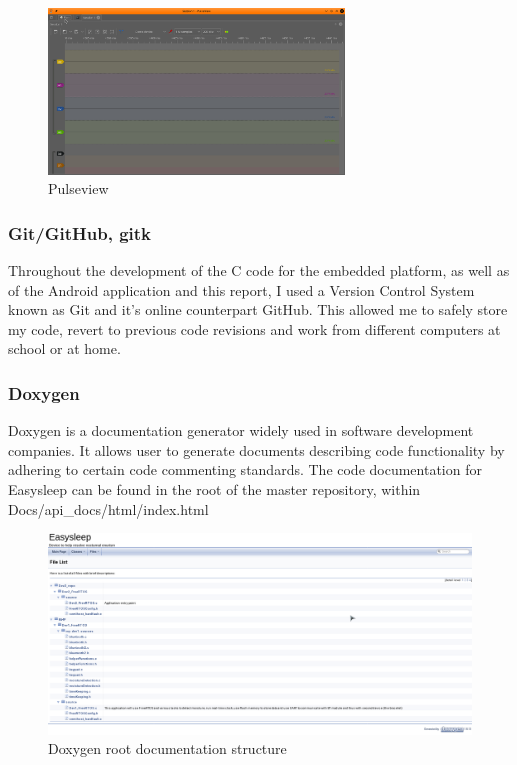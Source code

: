 \documentclass[12pt,a4paper]{article}
\begin{document}
            \begin{figure}[h]
                \centering
                \includegraphics[width=0.7\textwidth]{pulseview}
                \caption{Pulseview}
                \label{fig:pulseView}
            \end{figure}
        
            \subsubsection{Git/GitHub, gitk}
            Throughout the development of the C code for the embedded platform, as well as of the 
            Android application and this report, I used a Version Control System known as Git and 
            it's online counterpart GitHub. This allowed me to safely store my code, revert to 
            previous code revisions and work from different computers at school or at home.
            
            \subsubsection{Doxygen}
            Doxygen is a documentation generator widely used in software development companies. It
            allows user to generate documents describing code functionality by adhering 
            to certain code commenting standards. The code documentation for Easysleep can be found in the root of the master repository, within Docs/api\_docs/html/index.html\\
            
            \begin{figure}[h]
                \centering
                \includegraphics[width=\textwidth]{doxygen_root.png}
                \caption{Doxygen root documentation structure}
                \label{fig:doxygenRoot}
            \end{figure}
            
\end{document}
